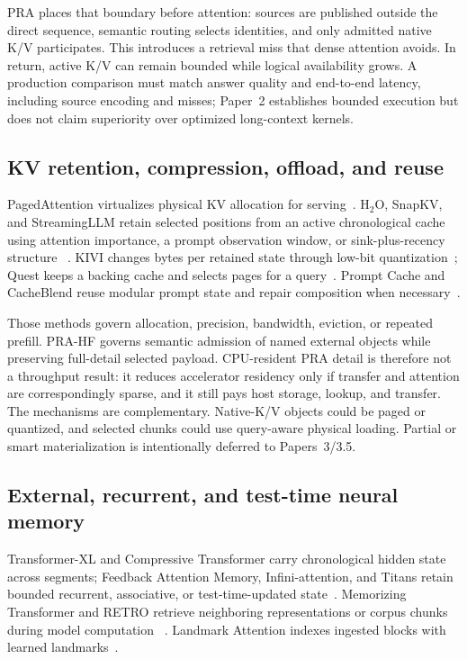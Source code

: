 \documentclass[11pt]{article}
\begin{document}
PRA places that boundary before attention: sources are published outside the direct sequence,
semantic routing selects identities, and only admitted native K/V participates. This introduces
a retrieval miss that dense attention avoids. In return, active K/V can remain bounded while
logical availability grows. A production comparison must match answer quality and end-to-end
latency, including source encoding and misses; Paper~2 establishes bounded execution but does not
claim superiority over optimized long-context kernels.

\subsection{KV retention, compression, offload, and reuse}

PagedAttention virtualizes physical KV allocation for serving~\cite{kwon2023vllm}. H$_2$O,
SnapKV, and StreamingLLM retain selected positions from an active chronological cache using
attention importance, a prompt observation window, or sink-plus-recency structure
~\cite{zhang2023h2o,li2024snapkv,xiao2023streamingllm}. KIVI changes bytes per retained state
through low-bit quantization~\cite{liu2024kivi}; Quest keeps a backing cache and selects pages
for a query~\cite{tang2024quest}. Prompt Cache and CacheBlend reuse modular prompt state and
repair composition when necessary~\cite{gim2023promptcache,yao2024cacheblend}.

Those methods govern allocation, precision, bandwidth, eviction, or repeated prefill. PRA-HF
governs semantic admission of named external objects while preserving full-detail selected
payload. CPU-resident PRA detail is therefore not a throughput result: it reduces accelerator
residency only if transfer and attention are correspondingly sparse, and it still pays host
storage, lookup, and transfer. The mechanisms are complementary. Native-K/V objects could be
paged or quantized, and selected chunks could use query-aware physical loading. Partial or smart
materialization is intentionally deferred to Papers~3/3.5.

\subsection{External, recurrent, and test-time neural memory}

Transformer-XL and Compressive Transformer carry chronological hidden state across segments;
Feedback Attention Memory, Infini-attention, and Titans retain bounded recurrent, associative,
or test-time-updated state~\cite{dai2019transformerxl,rae2020compressive,hwang2024fam,
munkhdalai2024infini,behrouz2025titans}. Memorizing Transformer and RETRO retrieve neighboring
representations or corpus chunks during model computation
~\cite{wu2022memorizing,borgeaud2022retro}. Landmark Attention indexes ingested blocks with
learned landmarks~\cite{mohtashami2023landmark}.
\end{document}
